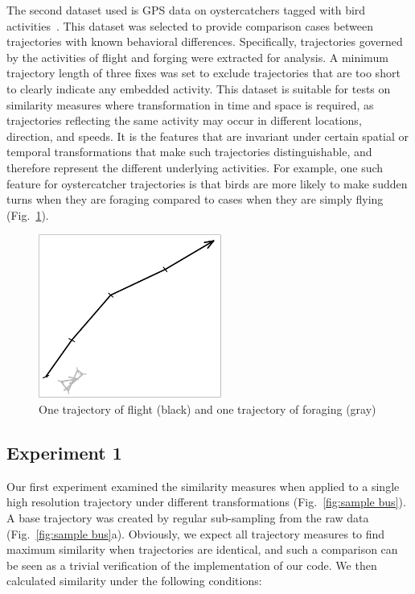 \documentclass[10pt,letterpaper]{article}
\begin{document}
The second dataset used is GPS data on oystercatchers tagged with bird activities~\cite{shamoun2012sensor}. This dataset was selected to provide comparison cases between trajectories with known behavioral differences. Specifically, trajectories governed by the activities of flight and forging were extracted for analysis. A minimum trajectory length of three fixes was set to exclude trajectories that are too short to clearly indicate any embedded activity.  
This dataset is suitable for tests on similarity measures where transformation in time and space is required, as trajectories reflecting the same activity may occur in different locations, direction, and speeds. It is the features that are invariant under certain spatial or temporal transformations that make such trajectories distinguishable, and therefore represent the different underlying activities. For example, one such feature for oystercatcher trajectories is that birds are more likely to make sudden turns when they are foraging compared to cases when they are simply flying (Fig.~\ref{fig:illu_flight_forage}).

\begin{figure}[ht]
	\centering
	\includegraphics[width=60mm]{figures/birdComparison}
	\caption{One trajectory of flight (black) and one trajectory of foraging (gray)}
	\label{fig:illu_flight_forage}
\end{figure}


\subsection{Experiment 1}
\label{par:experiment_1}
Our first experiment examined the similarity measures when applied to a single high resolution trajectory under different transformations (Fig.~\ref{fig:sample bus}). A base trajectory was created by regular sub-sampling from the raw data (Fig.~\ref{fig:sample bus}a). Obviously, we expect all trajectory measures to find maximum similarity when trajectories are identical, and such a comparison can be seen as a trivial verification of the implementation of our code.  We then calculated similarity under the following conditions: 
\end{document}
